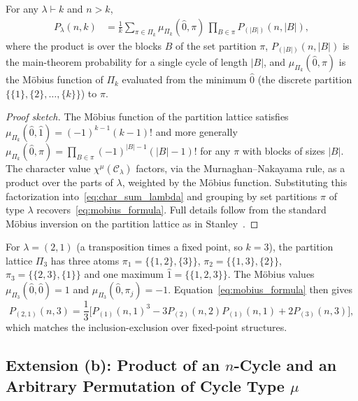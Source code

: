 \begin{theorem}\label{thm:mobius}
For any $\lambda\vdash k$ and $n>k$,
\begin{align}
  P_\lambda(n,k)
  &= \frac{1}{k}\sum_{\pi\in\Pi_k}\mu_{\Pi_k}(\hat{0},\pi)\,
     \prod_{B\in\pi}P_{(|B|)}(n,|B|),\label{eq:mobius_formula}
\end{align}
where the product is over the blocks $B$ of the set partition $\pi$,
$P_{(|B|)}(n,|B|)$ is the main-theorem probability for a single cycle of
length $|B|$, and $\mu_{\Pi_k}(\hat{0},\pi)$ is the Möbius function of
$\Pi_k$ evaluated from the minimum $\hat{0}$ (the discrete partition
$\{\{1\},\{2\},\ldots,\{k\}\}$) to $\pi$.
\end{theorem}
\begin{proof}[Proof sketch]
The Möbius function of the partition lattice satisfies
$\mu_{\Pi_k}(\hat{0},\hat{1})=(-1)^{k-1}(k-1)!$ and more generally
$\mu_{\Pi_k}(\hat{0},\pi)=\prod_{B\in\pi}(-1)^{|B|-1}(|B|-1)!$
for any $\pi$ with blocks of sizes $|B|$.  The character value
$\chi^\mu(\mathcal{C}_\lambda)$ factors, via the Murnaghan–Nakayama rule,
as a product over the parts of $\lambda$, weighted by the Möbius function.
Substituting this factorization into~\eqref{eq:char_sum_lambda} and
grouping by set partitions $\pi$ of type $\lambda$ recovers~\eqref{eq:mobius_formula}.
Full details follow from the standard Möbius inversion on the partition
lattice as in Stanley~\cite[Section~3.10]{StanleyEC1}.
\end{proof}

\begin{example}
For $\lambda=(2,1)$ (a transposition times a fixed point, so $k=3$), the
partition lattice $\Pi_3$ has three atoms
$\pi_1=\{\{1,2\},\{3\}\}$, $\pi_2=\{\{1,3\},\{2\}\}$, $\pi_3=\{\{2,3\},\{1\}\}$
and one maximum $\hat{1}=\{\{1,2,3\}\}$.  The Möbius values
$\mu_{\Pi_3}(\hat{0},\hat{0})=1$ and $\mu_{\Pi_3}(\hat{0},\pi_j)=-1$.
Equation~\eqref{eq:mobius_formula} then gives
\[
  P_{(2,1)}(n,3)
  = \frac{1}{3}\bigl[P_{(1)}(n,1)^3
    - 3P_{(2)}(n,2)P_{(1)}(n,1) + 2P_{(3)}(n,3)\bigr],
\]
which matches the inclusion-exclusion over fixed-point structures.
\end{example}

\subsection{Extension (b): Product of an \texorpdfstring{$n$}{n}-Cycle and an
  Arbitrary Permutation of Cycle Type \texorpdfstring{$\mu$}{μ}}

